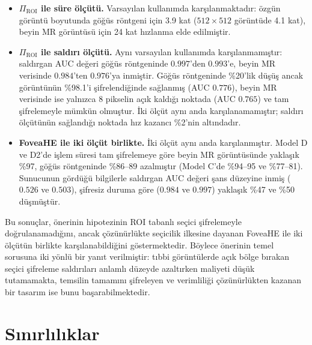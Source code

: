 \begin{itemize}
\item \textbf{$\Pi_{\mathrm{ROI}}$ ile süre ölçütü.} Varsayılan kullanımda karşılanmaktadır: özgün görüntü boyutunda göğüs röntgeni için 3.9 kat ($512 \times 512$ görüntüde 4.1 kat), beyin MR görüntüsü için 24 kat hızlanma elde edilmiştir.
\item \textbf{$\Pi_{\mathrm{ROI}}$ ile saldırı ölçütü.} Aynı varsayılan kullanımda karşılanmamıştır: saldırgan AUC değeri göğüs röntgeninde $0.997$'den $0.993$'e, beyin MR verisinde $0.984$'ten $0.976$'ya inmiştir. Göğüs röntgeninde \%20'lik düşüş ancak görüntünün \%98.1'i şifrelendiğinde sağlanmış (AUC $0.776$), beyin MR verisinde ise yalnızca 8 pikselin açık kaldığı noktada (AUC $0.765$) ve tam şifrelemeyle mümkün olmuştur. İki ölçüt aynı anda karşılanamamıştır; saldırı ölçütünün sağlandığı noktada hız kazancı \%2'nin altındadır.
\item \textbf{FoveaHE ile iki ölçüt birlikte.} İki ölçüt aynı anda karşılanmıştır. Model D ve D2'de işlem süresi tam şifrelemeye göre beyin MR görüntüsünde yaklaşık \%97, göğüs röntgeninde \%86--89 azalmıştır (Model C'de \%94--95 ve \%77--81). Sunucunun gördüğü bilgilerle saldırgan AUC değeri şans düzeyine inmiş ($0.526$ ve $0.503$), şifresiz duruma göre ($0.984$ ve $0.997$) yaklaşık \%47 ve \%50 düşmüştür.
\end{itemize}

Bu sonuçlar, önerinin hipotezinin ROI tabanlı seçici şifrelemeyle doğrulanamadığını, ancak çözünürlükte seçicilik ilkesine dayanan FoveaHE ile iki ölçütün birlikte karşılanabildiğini göstermektedir. Böylece önerinin temel sorusuna iki yönlü bir yanıt verilmiştir: tıbbi görüntülerde açık bölge bırakan seçici şifreleme saldırıları anlamlı düzeyde azaltırken maliyeti düşük tutamamakta, temsilin tamamını şifreleyen ve verimliliği çözünürlükten kazanan bir tasarım ise bunu başarabilmektedir.

\section{Sınırlılıklar}\label{sec:sinirliliklar}

